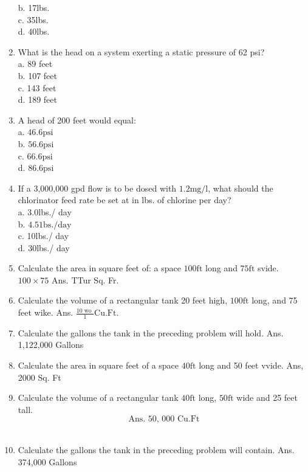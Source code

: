 \begin{enumerate}
b. 17lbs.\\
c. 35lbs.\\
d. 40lbs.\\
\item What is the head on a system exerting a static pressure of 62 psi?\\
a. 89 feet\\
b. 107 feet\\
c. 143 feet\\
d. 189 feet\\
\item A head of 200 feet would equal:\\
a. $46.6 \mathrm{psi}$\\
b. $56.6 \mathrm{psi}$\\
c. $66.6 \mathrm{psi}$\\
d. $86.6 \mathrm{psi}$\\
\item If a 3,000,000 gpd flow is to be dosed with $1.2 \mathrm{mg} / \mathrm{l}$, what should the chlorinator feed rate be set at in lbs. of chlorine per day?\\
a. 3.0lbs./ day\\
b. $4.5 \mathrm{1bs} . / \mathrm{day}$\\
c. 10lbs./ day\\
d. 30lbs./ day\\
\item Calculate the area in square feet of: a space $100 \mathrm{ft}$ long and $75 \mathrm{ft}$ svide. $100 \times 75$ Ans. TTur Sq. Fr.\\
\item Calculate the volume of a rectangular tank 20 feet high, $100 \mathrm{ft}$ long, and 75 feet wike. Ans. $\frac{10 \text { wo }}{1} \mathrm{Cu} . \mathrm{Ft}$.\\
\item Calculate the gallons the tank in the preceding problem will hold. Ans. 1,122,000 Gallons\\
\item Calculate the area in square feet of a space $40 \mathrm{ft}$ long and 50 feet vvide. Ans, 2000 Sq. Ft\\
\item Calculate the volume of a rectangular tank $40 \mathrm{ft}$ long, $50 \mathrm{ft}$ wide and 25 feet tall.\\
$$
\text { Ans. 50, } 000 \text { Cu.Ft }
$$\\
\item Calculate the gallons the tank in the preceding problem will contain. Ans. 374,000 Gallons\\

\end{enumerate}
